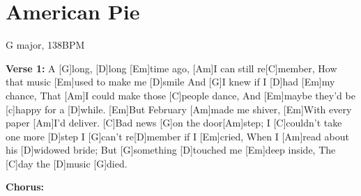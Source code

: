 \documentclass[../../songbookMain]{subfiles}
\begin{document}
\section{American Pie}
{\tiny
G major, 138BPM
}

\begin{guitar}
\begin{multicols}{2}
\textbf{Verse 1:}
A [G]long, [D]long [Em]time ago, 
[Am]I can still re[C]member,
How that music [Em]used to make me [D]smile
And [G]I knew if I [D]had [Em]my chance,
That [Am]I could make those [C]people dance,
And [Em]maybe they'd be [c]happy for a [D]while.
[Em]But February [Am]made me shiver,
[Em]With every paper [Am]I'd deliver.
[C]Bad news [G]on the door[Am]step;
I [C]couldn't take one more [D]step
I [G]can't re[D]member if I [Em]cried,
When I [Am]read about his [D]widowed bride;
But [G]something [D]touched me [Em]deep inside,
The [C]day the [D]music [G]died.

\textbf{Chorus:}

\end{multicols}


\end{guitar}
\end{document}
